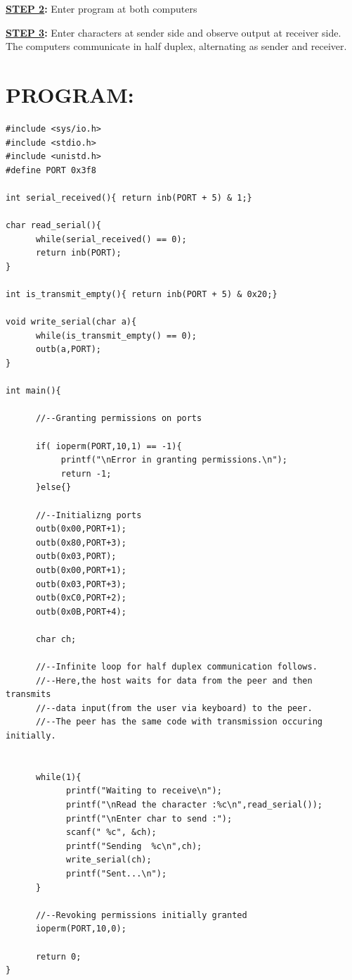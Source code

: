 \documentclass[a4paper,28pt,twoside,openright]{report}
\begin{document}
\textbf{\underline{STEP 2}:} Enter program at both computers

\textbf{\underline{STEP 3}:} Enter characters at sender side and observe output at receiver side. The computers  \hspace*{48pt}communicate in half duplex, alternating as sender and receiver.

\section*{PROGRAM:}
\begin{lstlisting}
#include <sys/io.h>
#include <stdio.h>
#include <unistd.h>
#define PORT 0x3f8

int serial_received(){ return inb(PORT + 5) & 1;}

char read_serial(){
      while(serial_received() == 0);
      return inb(PORT);
}

int is_transmit_empty(){ return inb(PORT + 5) & 0x20;}

void write_serial(char a){
      while(is_transmit_empty() == 0);
      outb(a,PORT);
}

int main(){

      //--Granting permissions on ports
      
      if( ioperm(PORT,10,1) == -1){
           printf("\nError in granting permissions.\n");
           return -1;
      }else{}
      
      //--Initializng ports
      outb(0x00,PORT+1);
      outb(0x80,PORT+3);
      outb(0x03,PORT);
      outb(0x00,PORT+1);
      outb(0x03,PORT+3);
      outb(0xC0,PORT+2);
      outb(0x0B,PORT+4);
      
      char ch;
      
      //--Infinite loop for half duplex communication follows.
      //--Here,the host waits for data from the peer and then transmits
      //--data input(from the user via keyboard) to the peer.
      //--The peer has the same code with transmission occuring initially.
      
      
      while(1){
            printf("Waiting to receive\n");
            printf("\nRead the character :%c\n",read_serial());
            printf("\nEnter char to send :");
            scanf(" %c", &ch);
            printf("Sending  %c\n",ch);
            write_serial(ch);
            printf("Sent...\n");
      }
      
      //--Revoking permissions initially granted
      ioperm(PORT,10,0);
      
      return 0;
}
\end{lstlisting}
\end{document}
